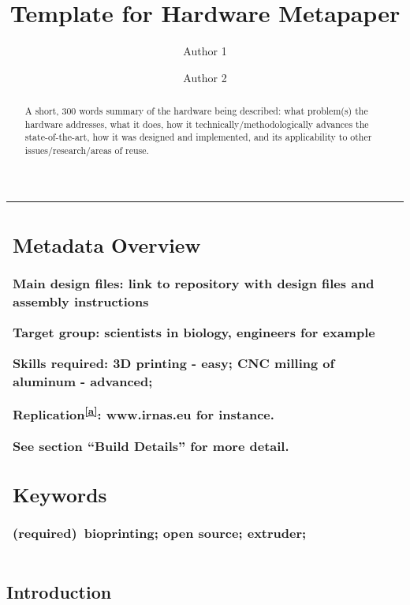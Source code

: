 \documentclass[a4paper]{article}
\title{Template for Hardware Metapaper}
\author[1]{Author 1}
\author[2]{Author 2}
\affil[1]{Author 1, Open Hardware project affiliation}
\affil[2]{Author 2, institutional affiliation}
\begin{document}
\maketitle


\begin{abstract}
A short, 300 words summary of the hardware being described: what problem(s) the hardware addresses, what it does, how it technically/methodologically advances the state-of-the-art, how it was designed and implemented, and its applicability to other issues/research/areas of reuse.
\end{abstract}

\begin{longtable}[]{@{}l@{}}
\begin{minipage}[t]{0.97\columnwidth}\raggedright\strut


\subsection{Metadata Overview}\label{h.akaipbqoqfs8}

Main design files: link to repository with design files and assembly instructions

Target group: scientists in biology, engineers for example

Skills required: 3D printing - easy; CNC milling of aluminum - advanced;

Replication\textsuperscript{\protect\hyperlink{cmnt1}{{[}a{]}}}{:
}{www.irnas.eu for instance.}

See section ``Build Details'' for more detail.


\subsection{Keywords}\label{h.kdz351yp7g7c}

{(required)}{~bioprinting; open source; extruder;}

\strut\end{minipage}\tabularnewline
\bottomrule
\end{longtable}


\subsection{Introduction}\label{h.pnj38xyr5dyy}
\end{document}
